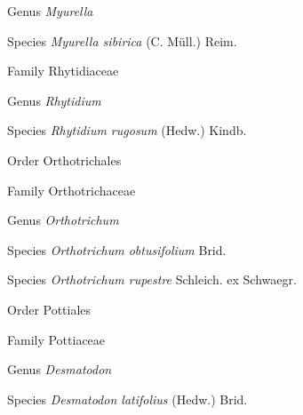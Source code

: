 \documentclass[9pt, article]{memoir}
\begin{document}
\begin{multicols}{2}
\vspace{6pt}\noindent\hspace{30pt}Genus \textit{Myurella}


\vspace{6pt}\noindent\hspace{36pt}Species \textit{Myurella sibirica} (C. Müll.) Reim.


\vspace{6pt}\noindent\hspace{24pt}Family Rhytidiaceae


\vspace{6pt}\noindent\hspace{30pt}Genus \textit{Rhytidium}


\vspace{6pt}\noindent\hspace{36pt}Species \textit{Rhytidium rugosum} (Hedw.) Kindb.


\vspace{6pt}\noindent\hspace{18pt}Order Orthotrichales


\vspace{6pt}\noindent\hspace{24pt}Family Orthotrichaceae


\vspace{6pt}\noindent\hspace{30pt}Genus \textit{Orthotrichum}


\vspace{6pt}\noindent\hspace{36pt}Species \textit{Orthotrichum obtusifolium} Brid.


\vspace{6pt}\noindent\hspace{36pt}Species \textit{Orthotrichum rupestre} Schleich. ex Schwaegr.


\vspace{6pt}\noindent\hspace{18pt}Order Pottiales


\vspace{6pt}\noindent\hspace{24pt}Family Pottiaceae


\vspace{6pt}\noindent\hspace{30pt}Genus \textit{Desmatodon}


\vspace{6pt}\noindent\hspace{36pt}Species \textit{Desmatodon latifolius} (Hedw.) Brid.



\end{multicols}
\end{document}
